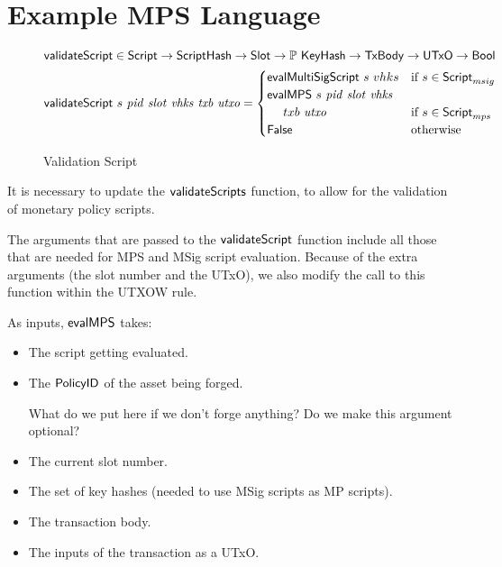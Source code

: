 \section{Example MPS Language}
\label{sec:mps-lang}


\begin{figure}[htb]
  \begin{align*}
    \mathsf{validateScript} & \in\mathsf{Script}\to\mathsf{ScriptHash}\to\mathsf{Slot}\to
    \mathbb{P}~\mathsf{KeyHash}\to\mathsf{TxBody}\to\mathsf{UTxO}\to\mathsf{Bool} \\
    \mathsf{validateScript} & ~s~\mathit{pid}~\mathit{slot}~\mathit{vhks}
     ~\mathit{txb}~\mathit{utxo} =
                           \begin{cases}
                             \mathsf{evalMultiSigScript}~s~vhks & \text{if}~s \in\mathsf{Script}_{msig} \\
                             \mathsf{evalMPS}~s~\mathit{pid}~\mathit{slot}~\mathit{vhks} \\
                              ~~~~txb~\mathit{utxo} & \text{if}~s \in\mathsf{Script}_{mps} \\
                             \mathsf{False} & \text{otherwise}
                           \end{cases}
  \end{align*}
  \caption{Validation Script}
  \label{fig:functions-validate}
\end{figure}

It is necessary to update the
$\mathsf{validateScripts}$ function, to allow for the validation of
monetary policy scripts.

The arguments that are passed to the $\mathsf{validateScript}$ function include all those
that are needed for MPS and MSig script evaluation. Because of the extra arguments
(the slot number and the UTxO), we also modify the call to this function
within the UTXOW rule.

As inputs, $\mathsf{evalMPS}$ takes:

\begin{itemize}
\item The script getting evaluated.
\item The $\mathsf{PolicyID}$ of the asset being forged.
  \begin{note}
    What do we put here if we don't forge anything? Do we make this argument optional?
  \end{note}
\item The current slot number.
\item The set of key hashes (needed to use MSig scripts as MP scripts).
\item The transaction body.
\item The inputs of the transaction as a UTxO.
\end{itemize}

